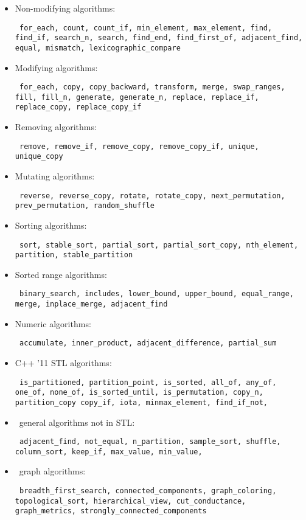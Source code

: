 \documentclass{report}
\begin{document}
\begin{itemize}
\item Non-modifying algorithms:

{\tt
for\_each, count, count\_if, min\_element, max\_element, 
find, find\_if, search\_n, search, find\_end, 
find\_first\_of, adjacent\_find, equal, mismatch, 
lexicographic\_compare
}

\item Modifying algorithms:

{\tt
for\_each, copy, copy\_backward, transform, merge, 
swap\_ranges, fill, fill\_n, generate, generate\_n, 
replace, replace\_if, replace\_copy, replace\_copy\_if
}

\item Removing algorithms:

{\tt
remove, remove\_if, remove\_copy, remove\_copy\_if, 
unique, unique\_copy
}

\item Mutating algorithms:

{\tt
reverse, reverse\_copy, rotate, rotate\_copy, 
next\_permutation, prev\_permutation, random\_shuffle
}

\item Sorting algorithms:

{\tt
sort, stable\_sort, partial\_sort, partial\_sort\_copy, 
nth\_element, partition, stable\_partition
}

\item Sorted range algorithms:

{\tt
binary\_search, includes, lower\_bound, upper\_bound, 
equal\_range, merge, inplace\_merge, adjacent\_find
}

\item Numeric algorithms:

{\tt
accumulate, inner\_product, adjacent\_difference, 
partial\_sum
}

\item C++ '11 STL algorithms:

{\tt
is\_partitioned, partition\_point, is\_sorted,
all\_of, any\_of, one\_of, none\_of,
is\_sorted\_until, is\_permutation,
copy\_n, partition\_copy
copy\_if, iota, minmax\_element,
find\_if\_not,
}

\item \stapl\ general algorithms not in STL:

{\tt
adjacent\_find, not\_equal,
n\_partition, sample\_sort, shuffle,
column\_sort, 
keep\_if, max\_value, min\_value,
}

\item \stapl\ graph algorithms:

{\tt
breadth\_first\_search, connected\_components, 
graph\_coloring, topological\_sort, hierarchical\_view, 
cut\_conductance, graph\_metrics, strongly\_connected\_components
}
\end{itemize}
\end{document}
